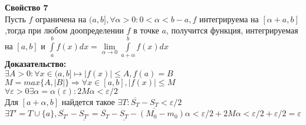 \documentclass[a4paper,12pt]{article} %
\begin{document}
\begin{enumerate}
   \textbf{Свойство 7}\\[5mm] Пусть $f$ ограничена на $(a,b], \forall \alpha > 0: 0<\alpha<b-a, f $ интегрируема на $[\alpha+a, b]$,тогда при любом доопределении $f$ в точке $a$, получится функция, интегрируемая на $[a,b]$ и $\int\limits_a^b f(x) dx = \lim \limits_{\alpha \rightarrow 0} \int\limits_{a+\alpha}^b f(x)dx$\\[2mm] 
   \textbf{Доказательство:}\\[2mm]
    $\exists A>0: \forall x \in (a,b] \longmapsto |f(x)|\leq A, f(a) = B$\\[2mm]
    $M = max\{A, |B|\} \Rightarrow \forall x \in [a,b], |f(x)|\leq M$\\[2mm]
    $\forall\varepsilon > 0 \exists \alpha = \alpha(\varepsilon):2M\alpha< \varepsilon/2$\\ [2mm]
    Для $[a+\alpha, b]$ найдется такое  $\exists T: \overline{S_T}- \underline{S_T}< \varepsilon/2$\\[2mm]
    $\exists T' = T \cup \{a\}, \overline{S_{T'}}- \underline{S_{T'}}= \overline{S_T}- \underline{S_T}-(M_0-m_0)\alpha<\varepsilon/2+2M\alpha<\varepsilon/2+\varepsilon/2=\varepsilon $\\[5mm]

\end{enumerate}
\end{document}
